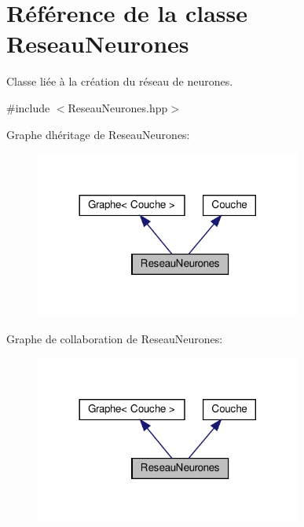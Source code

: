 \hypertarget{classReseauNeurones}{}\section{Référence de la classe Reseau\+Neurones}
\label{classReseauNeurones}


Classe liée à la création du réseau de neurones.  




{\ttfamily \#include $<$Reseau\+Neurones.\+hpp$>$}



Graphe d\textquotesingle{}héritage de Reseau\+Neurones\+:
\nopagebreak
\begin{figure}[H]
\begin{center}
\leavevmode
\includegraphics[width=248pt]{classReseauNeurones__inherit__graph}
\end{center}
\end{figure}


Graphe de collaboration de Reseau\+Neurones\+:
\nopagebreak
\begin{figure}[H]
\begin{center}
\leavevmode
\includegraphics[width=248pt]{classReseauNeurones__coll__graph}
\end{center}
\end{figure}
